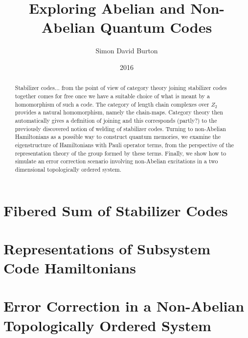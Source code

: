\documentclass[11pt,twoside,openright]{report}
\title{Exploring Abelian and Non-Abelian Quantum Codes}
\author{Simon David Burton}
\date{2016}
\begin{document}
\maketitle

\doublespacing

\declaration

\dedication{To my friends}

\begin{abstract}
Stabilizer codes... 
from the point of view of category theory
joining stabilizer codes together comes for free once
we have a suitable choice of what is meant by a
homomorphism of such a code. The category of
length chain complexes over $Z_2$ provides a natural
homomorphism, namely the chain-maps. Category theory
then automatically gives a definition of joining and
this corresponds (partly?) to the previously
discovered notion of welding of stabilizer codes.
Turning to non-Abelian Hamiltonians as a possible
way to construct quantum memories, we examine the
eigenstructure of Hamiltonians with Pauli operator
terms, from the perspective of the representation 
theory of the group formed by these terms.
Finally, we show how to simulate an error
correction scenario involving non-Abelian
excitations in a two dimensional topologically
ordered system.
\end{abstract}

\tableofcontents

\chapter{Fibered Sum of Stabilizer Codes}





\chapter{Representations of Subsystem Code Hamiltonians}





\chapter{Error Correction in a Non-Abelian Topologically Ordered System}







{}

\end{document}
